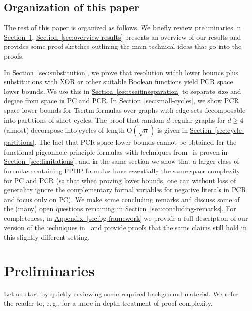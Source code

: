 \documentclass[11pt]{article}
\numberwithin{equation}{section}
\theoremstyle{definition}
\theoremstyle{plain}
\newcommand{\eg}{e.\,g.}
\newcommand{\expref}[2]{\hyperref[#2]{#1~\ref{#2}}}
\theoremstyle{plain}
\theoremstyle{definition}
\newcommand{\refsec}[1]{\expref{Section}{#1}}
\newcommand{\Refsec}[1]{\expref{Section}{#1}}
\newcommand{\refapp}[1]{\expref{Appendix}{#1}}
\newcommand{\bigoh}[1]{\mathrm{O} ( #1 )}
\newcommand{\mysubsection}[1]{\subsection{#1}}
\begin{document}
%

\mysubsection{Organization of this paper}

  The rest of this paper is organized as follows.
  We briefly review preliminaries in
 \refsec{sec:preliminaries}.
  \Refsec{sec:overview-results} presents an overview of
  our results and provides some proof sketches outlining the main
  technical ideas that go into the proofs.
%

  In
 \refsec{sec:substitution},
  we prove that resolution width lower bounds plus substitutions with
  XOR or other suitable Boolean functions yield PCR space lower bounds.
  We use this in 
 \refsec{sec:tseitinseparation}
  to separate size and degree from space in PC and PCR.
  In
 \refsec{sec:small-cycles},
  we show PCR space lower bounds for Tseitin formulas over graphs
  with edge sets decomposable into partitions of %
  short  %
  cycles.
  The proof that random \mbox{$d$-regular} graphs for $d \geq 4$ (almost)
  decompose into cycles of length $\bigoh{\sqrt{n}}$ is given in
 \refsec{sec:cycle-partitions}.
  The fact that PCR space lower bounds cannot be obtained for the
  functional pigeonhole principle formulas with techniques from~\cite{BG15Framework} is
  proven in
 \refsec{sec:limitations},
  and in the same section 
  we show that a larger class of formulas containing FPHP formulas
  have essentially the same space complexity for PC and PCR
  (so that when proving lower bounds, one can without loss of
  generality ignore the complementary formal variables for negative literals
  in PCR and focus only on PC).
%
%
%
  We make some concluding remarks and discuss some of the
  (many) open questions remaining in 
 \refsec{sec:concluding-remarks}.  %
  For completeness, 
  in
 \refapp{sec:bg-framework}
  we provide a full description of our version of
  the techniques in~\cite{BG15Framework}
  and provide proofs that the same claims  still hold in this slightly
  different setting. 
 
%
\section{Preliminaries}
\label{sec:preliminaries}

Let us start by quickly reviewing some required background material. 
We refer the reader to, 
%
%
\eg,      %
\cite{BN21ProofCplxSAT,Krajicek19ProofComplexity}
for a more in-depth treatment of proof complexity.
\end{document}
